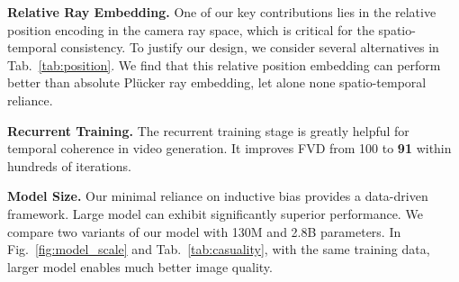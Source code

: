 \noindent\textbf{Relative Ray Embedding.}
One of our key contributions lies in the relative position encoding in the camera ray space, which is critical for the spatio-temporal consistency. To justify our design, we consider several alternatives in Tab.~\ref{tab:position}. We find that this relative position embedding can perform better than absolute Pl\"ucker ray embedding, let alone none spatio-temporal reliance.

\noindent\textbf{Recurrent Training.} The recurrent training stage is greatly helpful for temporal coherence in video generation. It improves FVD from 100 to \textbf{91} within hundreds of iterations.

\noindent\textbf{Model Size.} Our minimal reliance on inductive bias provides a data-driven framework. Large model can exhibit significantly superior performance. We compare two variants of our model with 130M and 2.8B parameters. In Fig.~\ref{fig:model_scale} and Tab.~\ref{tab:casuality}, with the same training data, larger model enables much better image quality.

